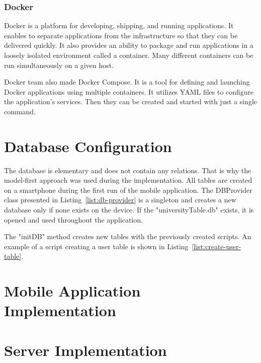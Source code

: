 \subsubsection{Docker}
Docker is a platform for developing, shipping, and running applications. It enables to separate applications from the infrastructure so that they can be delivered quickly. It also provides an ability to package and run applications in a loosely isolated environment called a container. Many different containers can be run simultaneously on a given host.~\cite{docker}

Docker team also made Docker Compose. It is a tool for defining and launching Docker applications using multiple containers. It utilizes YAML files to configure the application’s services. Then they can be created and started with just a single command.~\cite{docker-compose}

\section{Database Configuration}
The database is elementary and does not contain any relations. That is why the model-first approach was used during the implementation. All tables are created on a smartphone during the first run of the mobile application. The DBProvider class presented in Listing~\ref{list:db-provider} is a singleton and creates a new database only if none exists on the device. If the "universityTable.db" exists, it is opened and used throughout the application.



 The "initDB" method creates new tables with the previously created scripts. An example of a script creating a user table is shown in Listing~\ref{list:create-user-table}.



\section{Mobile Application Implementation}


\section{Server Implementation}
